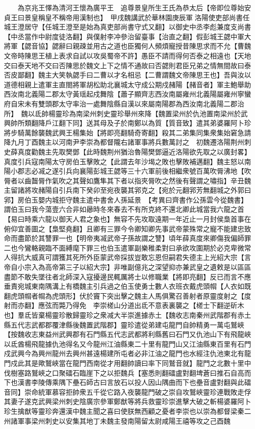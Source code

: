　　為京兆王懌為清河王懷為廣平王　追尊景皇所生王氏為恭太后【帝即位尊始安貞王曰景皇稱皇不稱帝用漢制也】　甲戌魏講武於華林園庚辰軍洛陽使吏部尚書任城王澄居守【任城王澄至是始為真吏部尚書守式又翻】以御史中丞李彪兼度支尚書【中丞當作中尉度徒洛翻】與僕射李冲參治留臺事【治直之翻】假彭城王勰中軍大將軍【勰音協】勰辭曰親疎並用古之道也臣獨何人頻煩寵授昔陳思求而不允【曹魏文帝時陳思王植上表求自試以攻吳蜀帝不許】愚臣不請而得何否泰之相遠也【天地交曰泰天地不交曰否陳思於魏文上下之情不通故曰否勰則君臣兄弟之情無間故曰泰否皮鄙翻】魏主大笑執勰手曰二曹以才名相忌【二曹謂魏文帝陳思王也】吾與汝以道德相親上遣軍主直閤將軍胡松助北襄城太守成公期戍赭陽【赭音者】軍主鮑舉助西汝南北義陽二郡太守黃瑶起戍舞陰【蕭子顯齊志西汝南屬雍州北義陽屬雍州寧蠻府自宋未有雙頭郡太守率治一處舞陰縣自漢以來屬南陽郡為西汝南北義陽二郡治所】　魏以氐帥楊靈珍為南梁州刺史靈珍舉州來降【魏置梁州於仇池置南梁州於武興帥所類翻降戶江翻下同】送其母及子於南鄭以為質【質音致】遣其弟婆羅阿卜珍將步騎萬餘襲魏武興王楊集始【將即亮翻騎奇寄翻】殺其二弟集同集衆集始窘急請降九月丁酉魏主以河南尹李崇為都督隴右諸軍事將兵數萬討之　初魏遷洛陽荆州刺史薛真度勸魏主先取樊鄧【此時魏荆州猶治魯陽樊鄧逼近洛陽欲先取之以廣封畧】真度引兵寇南陽太守房伯玉擊敗之【此謂去年沙堨之敗也擊敗補邁翻】魏主怒以南陽小郡志必㓕之遂引兵向襄陽彭城王勰等三十六軍前後相繼衆號百萬吹脣沸地【吹脣者以齒齧脣作氣吹之其聲如鷹隼其下者以指夾脣吹之然後有聲謂之嘯指】辛丑魏主留諸將攻赭陽自引兵南下癸卯至宛夜襲其郛克之【宛於元翻郛芳無翻城之外郭曰郛】房伯玉嬰内城拒守魏主遣中書舍人孫延景　【考異曰齊書作公孫雲今從魏書】謂伯玉曰我今蕩壹六合非如曏時冬來春去不有所克終不還北卿此城當我六龍之首【易曰時乘六龍以御天人君之象也】無容不先攻取遠期一年近止一月封侯梟首事在俯仰宜善圖之【梟堅堯翻】且卿有三罪今令卿知卿先事武帝蒙殊常之寵不能建忠致命而盡節於其讐罪一也【明帝夷㓕武帝子孫故謂之讐】頃年薛真度來卿傷我偏師罪二也今鸞輅親臨不面縛麾下罪三也伯玉遣軍副樂稚柔對曰承欲攻圍期於必克卑微常人得抗大威真可謂獲其死所外臣蒙武帝採拔豈敢忘恩但嗣君失德主上光紹大宗【言帝自小宗入為高帝第三子以紹大宗】非唯副億兆之深望抑亦兼武皇之遺敕是以區區盡節不敢失墜往者北師深入寇擾邊民輒厲將士以修職業【將即亮翻】反已而言不應垂責宛城東南隅溝上有橋魏主引兵過之伯玉使勇士數人衣班衣戴虎頭㡌【人衣如既翻虎頭㡌者㡌為虎頭形】伏於竇下突出擊之魏主人馬俱驚召善射者原靈度射之【度射而亦翻】應弦而斃乃得免　李崇槎山分道出氐不意表裏襲之【槎士下翻逆斫木也】羣氐皆棄楊靈珍散歸靈珍之衆减大半崇進據赤土【魏收志南秦州武階郡有赤土縣五代志武都郡覆津縣後魏置武階郡】靈珍遣從弟建屯龍門自帥精勇一萬屯鷲峽【按魏收志東益州武興郡有石門縣五代志武都將利縣舊曰石門又仇池山下有飛龍峽以氐酋楊飛龍據仇池得名又今龍州江油縣東二十里有龍門山又江油縣東百里有石門戍武興今為興州龍州去興州甚遠楊建所屯者必非江油之龍門也水經注仇池東北有龍門戍此其是歟鷲峽當在龍門西南從才用翻帥讀曰率下同鷲音就】龍門之北數十里中伐樹塞路鷲峽之口聚礌石臨崖下之以拒魏兵【塞悉則翻礌盧對翻埤蒼曰推石自高而下也漢書李陵傳乘隅下壘石師古曰言放石以投人因山隅曲而下也壘音盧對翻與此礌音同】崇命統軍慕容拒帥衆五千從它路入夜襲龍門破之崇自攻鷲峽靈珍連戰敗走俘其妻子遂克武興梁州刺史陰廣宗參軍鄭猷等將兵救靈珍崇進擊大破之斬楊婆羅阿卜珍生擒猷等靈珍奔還漢中魏主聞之喜曰使朕無西顧之憂者李崇也以崇為都督梁秦二州諸軍事梁州刺史以安集其地丁未魏主發南陽留太尉咸陽王禧等攻之己酉魏


